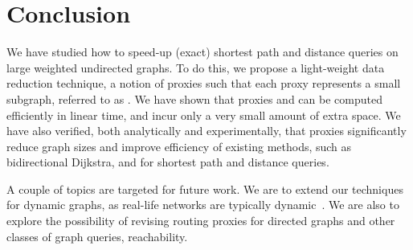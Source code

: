 \section{Conclusion}
\label{sec-con}

We have studied how to speed-up (exact)  shortest path and distance queries on large weighted undirected graphs.
To do this, we  propose  a light-weight data reduction technique, a notion of proxies such that each proxy represents a small subgraph, referred to as \dras. We have shown that
proxies and \dras can be computed efficiently in linear time, and incur only a very small amount of extra space.  We have also verified,
both analytically and experimentally, that proxies significantly reduce graph sizes and improve efficiency of existing methods, such as bidirectional Dijkstra, \arcflag and  \tnr for shortest path and distance queries.

A couple of topics are targeted for future work.
%
%
We are to extend our techniques for dynamic graphs, as real-life networks are typically dynamic~\cite{fcs-biggraph}.
%
%
We are also to explore the possibility of revising routing proxies for directed graphs and other classes of graph queries, \eg reachability.
